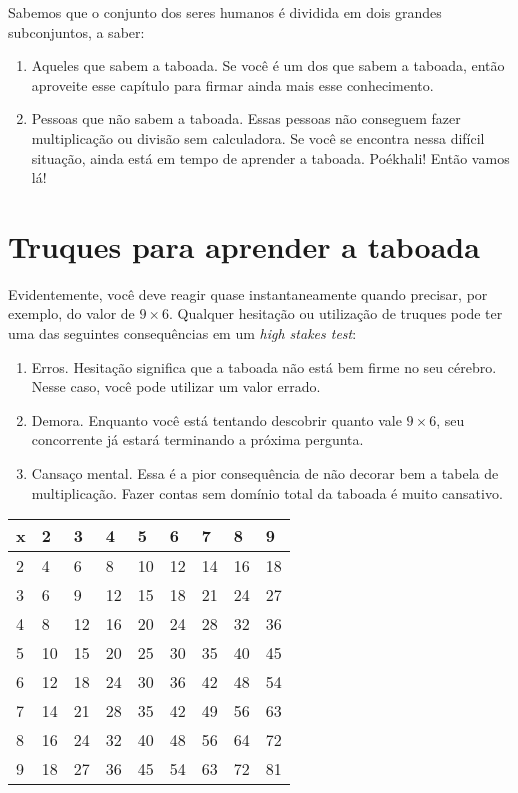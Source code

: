 \documentclass[12pt]{book}
\begin{document}
Sabemos que o conjunto dos seres humanos
é dividida em dois grandes subconjuntos, a saber:
\begin{enumerate}
\item Aqueles que sabem a taboada. Se você é um
dos que sabem a taboada, então aproveite esse
capítulo para firmar ainda mais esse conhecimento.
\item Pessoas que não sabem a taboada. Essas
pessoas não conseguem fazer multiplicação ou divisão
sem calculadora. Se você se encontra
nessa difícil situação, ainda está em tempo de
aprender a taboada. Poékhali! Então vamos lá!
\end{enumerate}

\section{Truques para aprender a taboada}
Evidentemente, você deve reagir quase instantaneamente
quando precisar, por exemplo, do valor de $9\times 6$.
Qualquer hesitação ou utilização de truques pode ter
uma das seguintes consequências em um {\em high stakes test}:
\begin{enumerate}
\item Erros. Hesitação significa que a taboada não está
bem firme no seu cérebro. Nesse caso, você pode utilizar
um valor errado.
\item Demora. Enquanto você está tentando descobrir quanto
vale $9\times 6$, seu concorrente já estará terminando
a próxima pergunta.
\item Cansaço mental. Essa é a pior consequência de não
decorar bem a tabela de multiplicação. Fazer contas sem
domínio total da taboada é muito cansativo.
\end{enumerate}

\begin{tabular}{p{1cm}p{1cm}p{1cm}p{1cm}p{1cm}p{1cm}p{1cm}p{1cm}p{1cm}}
\hline
x & 2  & 3  & 4  & 5  & 6  & 7  & 8  & 9  \\
\hline
2 & 4  & 6  & 8  & 10 & 12   & 14    & 16 & 18 \\
\hline
3 & 6   & 9   & 12   & 15   & 18   & 21   & 24   & 27   \\
\hline
4 & 8   & 12   & 16   & 20   & 24   & 28   & 32   & 36   \\
\hline
5 & 10   & 15   & 20   & 25   & 30   & 35   & 40   & 45   \\
\hline
6 & 12   & 18   & 24   & 30   & 36   & 42   & 48   & 54   \\
\hline
7 & 14   & 21   & 28   & 35   & 42   & 49   & 56   & 63   \\
\hline
8 & 16   & 24   & 32   & 40   & 48   & 56   & 64   & 72   \\
\hline
9 & 18   & 27   & 36   & 45   & 54   & 63   & 72   & 81   \\
\hline
\end{tabular}
\end{document}
